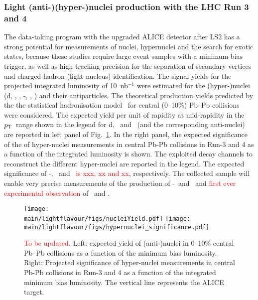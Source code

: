 \subsubsection{Light (anti-)(hyper-)nuclei production with the LHC Run 3 and 4}
The data-taking program with the upgraded ALICE detector after LS2 has a strong potential for measurements of nuclei, hypernuclei and the search for exotic states, because these studies require large event samples with a minimum-bias trigger, as well as high tracking precision for the separation of secondary vertices 
and charged-hadron (light nucleus) identification. The signal yields for the projected integrated luminosity of 10~nb$^{-1}$ were estimated for the 
(hyper-)nuclei (d,  \hethree, \hefour, \hyp, \hypfour, \hyphefour) and their antiparticles.
The theoretical production yields predicted by the the statistical hadronisation 
model~\cite{Andronic:2010qu} for central (0--10\%) Pb--Pb collisions 
were considered. 
The expected yield per unit of rapidity at mid-rapidity in the $p_{\rm T}$\ range shown in the legend for d, \hethree\
and \hefour\ (and the corresponding anti-nuclei) are reported in left panel of Fig.~\ref{fig:yieldrun34}. 
In the right panel, the expected significance of the of hyper-nuclei measurements in central Pb-Pb 
collisions in Run-3 and 4 as a function of the integrated luminosity is shown. The exploited decay channels to reconstruct the different hyper-nuclei are reported in the legend. 
The expected significance 
of \hyp, \hypfour\ and \hyphefour\ \textcolor{red}{is xxx, xx and xx}, respectively. The collected sample will enable 
very precise measurements of the production of \hyp\ and \antihyp\ and \textcolor{red}{first ever experimental observation} of \antihypfour\ and \antihehypfour.

\begin{figure}[ht]
\begin{center}
\texttt{[image: \\main/lightflavour/figs/nucleiYield.pdf]}
\texttt{[image: \\main/lightflavour/figs/hypernuclei\_significance.pdf]}
\end{center}
\caption{\textcolor{red}{To be updated.} Left: expected yield of (anti-)nuclei in 0--10$\%$ central Pb--Pb collisions as a function of the minimum bias luminosity. 
Right: Projected significance of hyper-nuclei measurements in central Pb-Pb collisions in Run-3 and 4 as a function of the integrated minimum bias luminosity. 
The vertical line represents the ALICE target.}
\label{fig:yieldrun34}
\end{figure}

